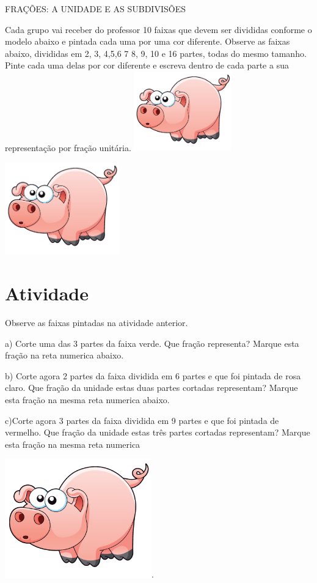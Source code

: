 \documentclass[a4,12pt]{book}
\newcounter{atividade}
\begin{document}
FRAÇÕES: A UNIDADE E AS SUBDIVISÕES



Cada grupo vai receber do professor 10 faixas que devem ser divididas conforme o modelo abaixo e pintada cada uma por uma cor diferente.
Observe as faixas abaixo, divididas em 2, 3, 4,5,6 7 8, 9, 10 e 16 partes, todas do mesmo tamanho. Pinte cada uma delas por cor diferente e escreva dentro de cada parte a sua representação por fração unitária.
\includegraphics[width=120pt, keepaspectratio]{pig}




\includegraphics[width=\textwidth,height=4cm, keepaspectratio]{pig}
\section{Atividade}





Observe as faixas pintadas na atividade anterior.

a) Corte uma das 3 partes da faixa verde. Que fração representa? Marque esta fração na reta numerica abaixo.

b) Corte agora 2 partes da faixa dividida em 6 partes e que foi pintada de rosa claro. Que fração da unidade estas duas partes cortadas representam? Marque esta fração na mesma reta numerica abaixo.

c)Corte agora 3 partes da faixa dividida em 9 partes e que foi pintada de vermelho. Que fração da unidade estas três partes cortadas representam? Marque esta fração na mesma reta numerica

\includegraphics[width=180pt, keepaspectratio]{pig}.
\end{document}
